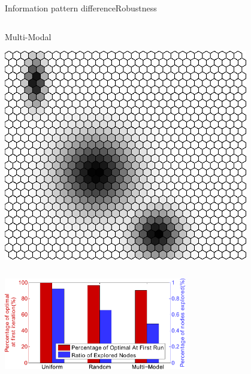 \begin{frame}{Information pattern difference}{Robustness}
\begin{columns}
\begin{block}{Multi-Modal}
\begin{center}
\includegraphics[width=0.8\textwidth]{./figure/ENV_MM}
\end{center}
\end{block}

\end{columns}

\begin{center}
\includegraphics[width=0.6\textwidth]{./figure/EnvPerform}
\end{center}


\end{frame}

